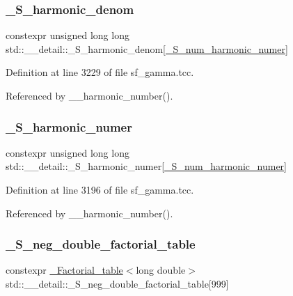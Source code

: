 \subsubsection{\texorpdfstring{\+\_\+\+S\+\_\+harmonic\+\_\+denom}{\_S\_harmonic\_denom}}
{\footnotesize\ttfamily constexpr unsigned long long std\+::\+\_\+\+\_\+detail\+::\+\_\+\+S\+\_\+harmonic\+\_\+denom\mbox{[}\hyperlink{namespacestd_1_1____detail_a554788747841f6abbfd7572673df32ad}{\+\_\+\+S\+\_\+num\+\_\+harmonic\+\_\+numer}\mbox{]}}



Definition at line 3229 of file sf\+\_\+gamma.\+tcc.



Referenced by \+\_\+\+\_\+harmonic\+\_\+number().

\mbox{\label{namespacestd_1_1____detail_a3976bb1731d7ecfaba4601d1083d7cf6}} 
\subsubsection{\texorpdfstring{\+\_\+\+S\+\_\+harmonic\+\_\+numer}{\_S\_harmonic\_numer}}
{\footnotesize\ttfamily constexpr unsigned long long std\+::\+\_\+\+\_\+detail\+::\+\_\+\+S\+\_\+harmonic\+\_\+numer\mbox{[}\hyperlink{namespacestd_1_1____detail_a554788747841f6abbfd7572673df32ad}{\+\_\+\+S\+\_\+num\+\_\+harmonic\+\_\+numer}\mbox{]}}



Definition at line 3196 of file sf\+\_\+gamma.\+tcc.



Referenced by \+\_\+\+\_\+harmonic\+\_\+number().

\mbox{\label{namespacestd_1_1____detail_adb3fbe0d6f7c40b02e479b63d547f57c}} 
\subsubsection{\texorpdfstring{\+\_\+\+S\+\_\+neg\+\_\+double\+\_\+factorial\+\_\+table}{\_S\_neg\_double\_factorial\_table}}
{\footnotesize\ttfamily constexpr \hyperlink{structstd_1_1____detail_1_1__Factorial__table}{\+\_\+\+Factorial\+\_\+table}$<$long double$>$ std\+::\+\_\+\+\_\+detail\+::\+\_\+\+S\+\_\+neg\+\_\+double\+\_\+factorial\+\_\+table\mbox{[}999\mbox{]}}




